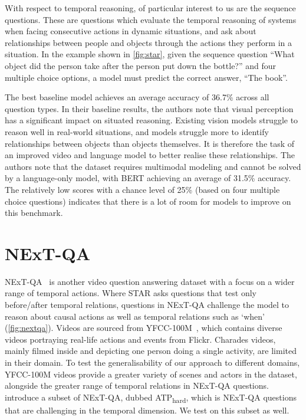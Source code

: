 With respect to temporal reasoning, of particular interest to us are the
sequence questions. These are questions which evaluate the temporal reasoning
of systems when facing consecutive actions in dynamic situations, and ask about
relationships between people and objects through the actions they perform in a
situation. In the example shown in \cref{fig:star}, given the sequence question
``What object did the person take after the person put down the bottle?'' and
four multiple choice options, a model must predict the correct answer, ``The
book''.

The best baseline model achieves an average accuracy of 36.7\% across all
question types. In their baseline results, the authors note that visual
perception has a significant impact on situated reasoning. Existing vision
models struggle to reason well in real-world situations, and models struggle
more to identify relationships between objects than objects themselves. It is
therefore the task of an improved video and language model to better realise
these relationships. The authors note that the dataset requires multimodal
modeling and cannot be solved by a language-only model, with BERT achieving an
average of 31.5\% accuracy. The relatively low scores with a chance level of
25\% (based on four multiple choice questions) indicates that there is a lot of
room for models to improve on this benchmark.

\section{NExT-QA}
\label{sec:nextqa}
NExT-QA~\citep{xiao2021nextqa} is another video question answering dataset with
a focus on a wider range of temporal actions. Where STAR asks questions that
test only before/after temporal relations, questions in NExT-QA challenge the
model to reason about causal actions as well as temporal relations such as
`when' (\cref{fig:nextqa}). Videos are sourced from
YFCC-100M~\citep{thomee2016yfcc100m}, which contains diverse videos portraying
real-life actions and events from Flickr. Charades videos, mainly filmed inside
and depicting one person doing a single activity, are limited in their domain.
To test the generalisability of our approach to different domains, YFCC-100M
videos provide a greater variety of scenes and actors in the dataset, alongside
the greater range of temporal relations in NExT-QA questions.
\citet{buch2022revisiting} introduce a subset of NExT-QA, dubbed
ATP\textsubscript{hard}, which is NExT-QA questions that are challenging in the
temporal dimension. We test on this subset as well.

